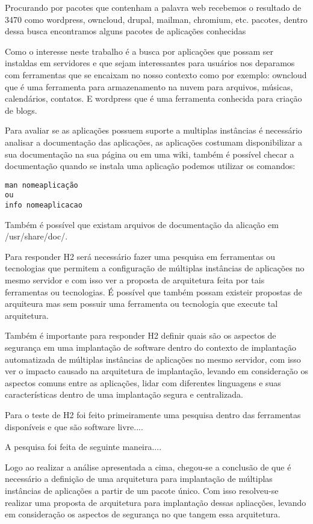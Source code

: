 Procurando por pacotes que contenham a palavra web recebemos o resultado de 3470
como wordpress, owncloud, drupal, mailman, chromium, etc.
pacotes, dentro dessa busca encontramos alguns pacotes de aplicações conhecidas

Como o interesse neste trabalho é a busca por aplicações que possam ser instaldas
em servidores e que sejam interessantes para usuários nos deparamos com ferramentas
que se encaixam no nosso contexto como por exemplo: owncloud que é uma ferramenta para armazenamento
na nuvem para arquivos, músicas, calendários, contatos. E wordpress que é
uma ferramenta conhecida para criação de blogs.

Para avaliar se as aplicações possuem suporte a multiplas instâncias é necessário
analisar a documentação das aplicações, as aplicações costumam disponibilizar a sua
documentação na sua página ou em uma wiki, também é possível checar a documentação
quando se instala uma aplicação podemos utilizar os comandos:

\begin{verbatim}
man nomeaplicação
ou
info nomeaplicacao
\end{verbatim}

Também é possível que existam arquivos de documentação da alicação em /usr/share/doc/.


Para responder H2 será necessário fazer uma pesquisa em ferramentas ou tecnologias que
permitem a configuração de múltiplas instâncias de aplicações no mesmo servidor e com
isso ver a proposta de arquitetura feita por tais ferramentas ou tecnologias. É
possível que também possam existeir propostas de arquiteura mas sem possuir uma
ferramenta ou tecnologia que execute tal arquitetura.

Também é importante para responder H2 definir quais são os aspectos de segurança em
uma implantação de software dentro do contexto de implantação automatizada de múltiplas instâncias de aplicações no mesmo servidor,
com isso ver o impacto causado na arquitetura de implantação, levando em consideração os
aspectos comuns entre as aplicações, lidar com diferentes linguagens e suas características
dentro de uma implantação segura e centralizada.


Para o teste de H2 foi feito primeiramente uma pesquisa dentro das ferramentas
disponíveis e que são software livre....

A pesquisa foi feita de seguinte maneira....

Logo ao realizar a análise apresentada a cima, chegou-se a conclusão de que
é necessário a definição de uma arquitetura para implantação de múltiplas
instâncias de aplicações a partir de um pacote único. Com isso resolveu-se
realizar uma proposta de arquitetura para implantação dessas apliacções, levando
em consideração os aspectos de segurança no que tangem essa arquitetura.

